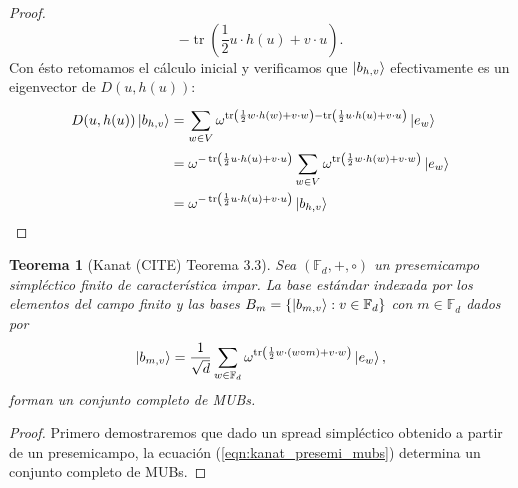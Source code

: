 \documentclass[a4paper]{report}
\DeclareMathOperator{\tr}{tr}
\newtheorem{theorem}{Teorema}
\begin{document}
\begin{proof}
\begin{equation}
      - \tr\left( \frac{1}{2} u \cdot h(u) + v \cdot u
      \right).
    \end{equation}
    Con ésto retomamos el cálculo inicial y verificamos que
    $\ket{b_{h,v}}$ efectivamente es un eigenvector de
    $D(u,h(u))$:
    \begin{align}
      D(u,h(u)) \ket{b_{h,v}}
      &= \sum_{w \in V}^{} \omega^{\tr\left( \frac{1}{2} w
      \cdot h(w) + v \cdot w \right) - \tr\left( \frac{1}{2}
      u \cdot h(u) + v \cdot u\right) } \ket{e_w} \\
      &= \omega^{-\tr\left( \frac{1}{2} u \cdot h(u) + v
      \cdot u \right) } \sum_{w \in V}^{} \omega^{\tr\left(
      \frac{1}{2} w \cdot h(w) + v \cdot w\right) }
      \ket{e_w} \\
      &= \omega^{-\tr\left( \frac{1}{2} u \cdot h(u) + v
      \cdot u \right) } \ket{b_{h,v}}
    \end{align}
  \end{proof}

  \begin{theorem}[Kanat (CITE) Teorema 3.3]
    \label{thm:kanat_presemi_mubs}
    Sea $(\mathbb F_d, +, \circ)$ un presemicampo
    simpléctico finito de característica impar. La base
    estándar indexada por los elementos del campo finito y
    las bases $B_m = \{\ket{b_{m,v}} : v \in \mathbb F_d\}$ 
    con $m \in \mathbb F_d$ dados por
    \begin{equation}
      \label{eqn:kanat_presemi_mubs}
      \ket{b_{m,v}}
      = \frac{1}{\sqrt{d}} \sum_{w \in \mathbb F_d}^{}
      \omega^{\tr\left( \frac{1}{2} w \cdot (w \circ m) + v
      \cdot w\right) } \ket{e_w},
    \end{equation} 
    forman un conjunto completo de MUBs.
  \end{theorem}
  \begin{proof}
    Primero demostraremos que dado un spread simpléctico
    obtenido a partir de un presemicampo, la ecuación
    (\ref{eqn:kanat_presemi_mubs}) determina un conjunto
    completo de MUBs.  
  \end{proof}
\end{document}
